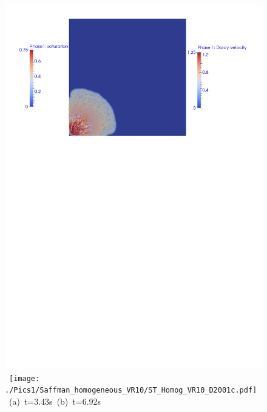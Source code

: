 \begin{landscape}
\begin{figure}[ht] 
\vbox{\vspace{-1cm}
\hbox{\includegraphics[width=\textwidth]{./Pics1/Saffman_homogeneous_VR10/ST_Homog_VR10_D1001cbd.pdf}
      \texttt{[image: ./Pics1/Saffman\_homogeneous\_VR10/ST\_Homog\_VR10\_D2001c.pdf]}}
\vspace{0.cm}
\hbox{\hspace{5.cm} (a) t=3.43s  \hspace{8.cm} (b) t=6.92s}
\vspace{0.5cm}
\hbox{\hspace{3cm}
}}
\end{figure}
\end{landscape}

